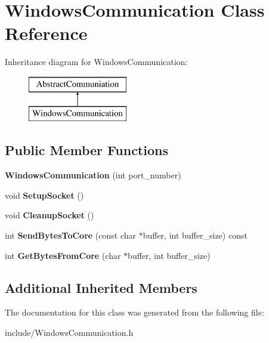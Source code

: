 \hypertarget{class_windows_communication}{}\section{Windows\+Communication Class Reference}
\label{class_windows_communication}
Inheritance diagram for Windows\+Communication\+:\begin{figure}[H]
\begin{center}
\leavevmode
\includegraphics[height=2.000000cm]{class_windows_communication}
\end{center}
\end{figure}
\subsection*{Public Member Functions}
\begin{DoxyCompactItemize}
\item 
\hypertarget{class_windows_communication_aed89a58fa57d0bd0cc6d0342310977ce}{}\label{class_windows_communication_aed89a58fa57d0bd0cc6d0342310977ce} 
{\bfseries Windows\+Communication} (int port\+\_\+number)
\item 
\hypertarget{class_windows_communication_a18db3adb397e4c9036e39887485e0f32}{}\label{class_windows_communication_a18db3adb397e4c9036e39887485e0f32} 
void {\bfseries Setup\+Socket} ()
\item 
\hypertarget{class_windows_communication_a0e6b9db2e11a01ba976f2d1528e0b98f}{}\label{class_windows_communication_a0e6b9db2e11a01ba976f2d1528e0b98f} 
void {\bfseries Cleanup\+Socket} ()
\item 
\hypertarget{class_windows_communication_a8acfdac5781409bf6e563ea620ae6d3b}{}\label{class_windows_communication_a8acfdac5781409bf6e563ea620ae6d3b} 
int {\bfseries Send\+Bytes\+To\+Core} (const char $\ast$buffer, int buffer\+\_\+size) const
\item 
\hypertarget{class_windows_communication_a634009aa53f3737ee2612dcde51d081a}{}\label{class_windows_communication_a634009aa53f3737ee2612dcde51d081a} 
int {\bfseries Get\+Bytes\+From\+Core} (char $\ast$buffer, int buffer\+\_\+size)
\end{DoxyCompactItemize}
\subsection*{Additional Inherited Members}


The documentation for this class was generated from the following file\+:\begin{DoxyCompactItemize}
\item 
include/Windows\+Communication.\+h\end{DoxyCompactItemize}
